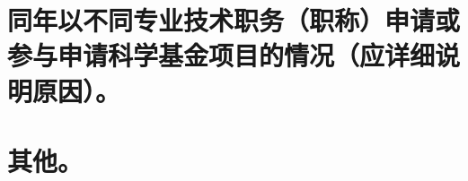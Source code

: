 \documentclass[UTF8, punct, oneside,fontset=none]{ctexbook}
\begin{document}
\begin{MS}
	
\end{MS}

\section{同年以不同专业技术职务\kg{0.3em}（职称）\kg{0.3em}申请或参与申请科学基金项目的情况（应详细说明原因）。}

\begin{MS}
	
\end{MS}

\section{其他。}

\begin{MS}
	
\end{MS}
\end{document}
